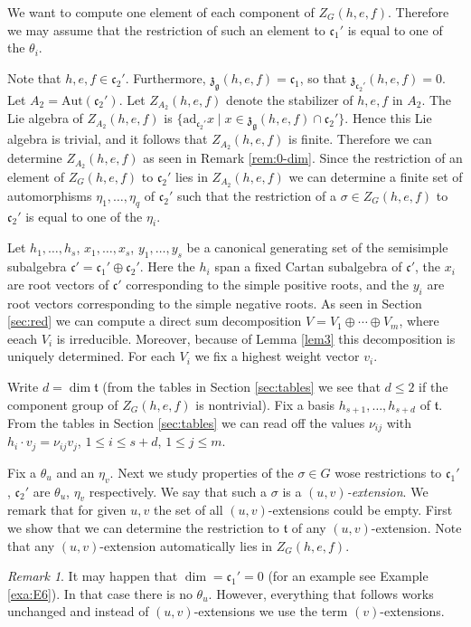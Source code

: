 \documentclass[a4paper,10pt]{amsart}
\newcommand{\mf}{\mathfrak}
\newcommand{\g}{\mf{g}}
\renewcommand{\c}{\mf{c}}
\newcommand{\z}{\mf{z}}
\newcommand{\ttt}{\mf{t}}
\newcommand{\ad}{\mathrm{ad}}
\newcommand{\Aut}{\mathrm{Aut}}
\numberwithin{equation}{section}
\theoremstyle{remark}
\theoremstyle{remark}
\newtheorem{rmk}[theorem]{Remark}
\begin{document}
We want to compute one element of each component
of $Z_G(h,e,f)$. Therefore we may assume that the restriction of such an
element to $\c_1'$ is equal to one of the $\theta_i$. 

Note that $h,e,f\in \c_2'$. Furthermore, $\z_\g(h,e,f) = \c_1$, so that
$\z_{\c_2'}(h,e,f)=0$. Let $A_2= \Aut(\c_2')$. Let $Z_{A_2}(h,e,f)$ denote the
stabilizer of $h,e,f$ in $A_2$. The Lie algebra of $Z_{A_2}(h,e,f)$ is
$\{ \ad_{\c_2'} x \mid x \in \z_\g(h,e,f) \cap \c_2'\}$. Hence this Lie algebra
is trivial, and it follows that $Z_{A_2}(h,e,f)$ is finite. Therefore we can
determine $Z_{A_2}(h,e,f)$ as seen in Remark \ref{rem:0-dim}. Since the
restriction of an element of $Z_G(h,e,f)$ to $\c_2'$ lies in $Z_{A_2}(h,e,f)$
we can determine a finite set of automorphisms $\eta_1,\ldots,\eta_q$ 
of $\c_2'$ such that the
restriction of a $\sigma\in Z_G(h,e,f)$ to $\c_2'$ is equal to one of the
$\eta_i$.

Let $h_1,\ldots,h_s$, $x_1,\ldots,x_s$, $y_1,\ldots,y_s$ be a canonical
generating set of the semisimple subalgebra $\c'=\c_1'\oplus \c_2'$.
Here the $h_i$ span a fixed Cartan subalgebra of $\c'$, the
$x_i$ are root vectors of $\c'$ corresponding to the simple positive roots, and the
$y_i$ are root vectors corresponding to the simple negative roots. As seen in
Section \ref{sec:red} we can compute a direct sum decomposition $V = V_1\oplus
\cdots\oplus V_m$, where eeach $V_i$ is irreducible. Moreover, because of
Lemma \ref{lem3} this decomposition is uniquely determined. For each $V_i$
we fix a highest weight vector $v_i$. 

Write $d=\dim \ttt$ (from the tables in Section \ref{sec:tables} we
see that $d\leq 2$ if the component group of $Z_G(h,e,f)$ is nontrivial).
Fix a basis $h_{s+1},\ldots,h_{s+d}$ of $\ttt$. From the tables in Section
\ref{sec:tables} we can read off the values $\nu_{ij}$ with $h_i\cdot v_j =
\nu_{ij} v_j$, $1\leq i\leq s+d$, $1\leq j\leq m$.

Fix a $\theta_u$ and an $\eta_v$. Next we study properties of the $\sigma\in
G$ wose restrictions to $\c_1'$, $\c_2'$ are $\theta_u$, $\eta_v$ respectively.
We say that such a $\sigma$ is a {\em $(u,v)$-extension}. We remark that for
given $u,v$ the set of all $(u,v)$-extensions could be empty. First we show
that we can determine the restriction to $\ttt$ of any $(u,v)$-extension.
Note that any $(u,v)$-extension automatically lies in $Z_G(h,e,f)$.

\begin{rmk}\label{rem:vext}
It may happen that $\dim = \c_1'=0$ (for an example see Example \ref{exa:E6}).
In that case there is no $\theta_u$. However, everything that follows works
unchanged and instead of $(u,v)$-extensions we use the term $(v)$-extensions. 
\end{rmk}  
\end{document}
